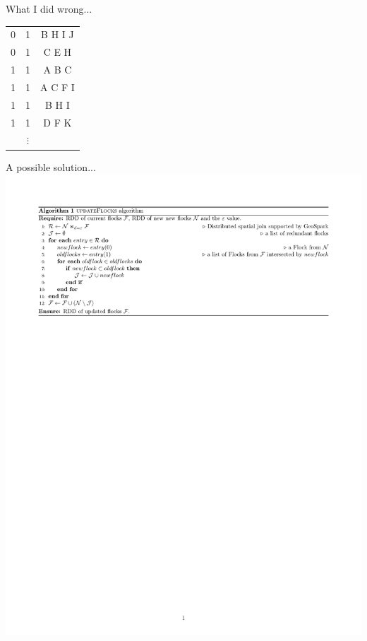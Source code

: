 \documentclass{beamer}
\begin{document}
\begin{frame}{What I did wrong...}
\begin{minipage}{0.32\textwidth}
{\begin{tabular}{ c c c}
                0 & 1 & B H I J \\
                0 & 1 & C E H \\
                1 & 1 & A B C \\
                \rowcolor{lightgreen}
                1 & 1 & A C F I\\
                1 & 1 & B H I \\
                1 & 1 & D F K \\
                & $\vdots$ & \\ \hline
            \end{tabular}
        }
    \end{minipage}
\end{frame}

\begin{frame}{A possible solution...}
    \centering
    \includegraphics[trim={2cm 10 2cm 2},clip,width=1\linewidth]{Figures/algorithm}
\end{frame}
\end{document}
